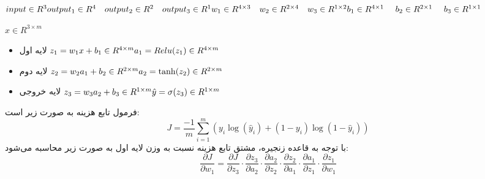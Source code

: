 
\setLTR
$
input \in R^{3} \\
output_1 \in R^{4} \ \ \ output_2 \in R^{2} \ \ \ output_3 \in R^{1} \\
w_1 \in R^{4\times 3} \ \ \ w_2 \in R^{2\times 4} \ \ \ w_3 \in R^{1 \times 2} \\
b_1 \in R^{4\times 1} \ \ \ \ b_2 \in R^{2\times 1} \ \ \ \ b_3 \in R^{1 \times1} 
$
\setRTL

\setLTR
$
x \in R^{3\times m}
$
\setRTL
\begin{itemize}
    \item{لایه اول}
    \setLTR
    $\\
    z_1 = w_1 x + b_1 \in R^{4\times m} \\
    a_1 = Relu(z_1) \in R^{4\times m} \\
    $
    \setRTL
    \item{لایه دوم}
    \setLTR
    $\\
    z_2 = w_2 a_1 + b_2 \in R^{2\times m} \\
    a_2 = \tanh(z_2) \in R^{2\times m} \\
    $
    \setRTL
    \item{لایه خروجی}
    \setLTR
    $\\
    z_3 = w_3 a_2 + b_3 \in R^{1\times m} \\
    \hat{y} = \sigma(z_3) \in R^{1\times m} \\
    $
    \setRTL
\end{itemize}


فرمول تابع هزینه به صورت زیر است:
\[
J = \frac{-1}{m} \sum_{i=1}^{m} \left( y_i \log(\hat{y}_i) + (1-y_i) \log(1-\hat{y}_i) \right)
\]
با توجه به قاعده زنجیره، مشتق تابع هزینه نسبت به وزن لایه اول به صورت زیر محاسبه می‌شود:
\[
\frac{\partial J}{\partial w_1} = \frac{\partial J}{\partial z_3} \cdot \frac{\partial z_3}{\partial a_2} \cdot \frac{\partial a_2}{\partial z_2} \cdot \frac{\partial z_2}{\partial a_1} \cdot \frac{\partial a_1}{\partial z_1} \cdot \frac{\partial z_1}{\partial w_1}
\]

